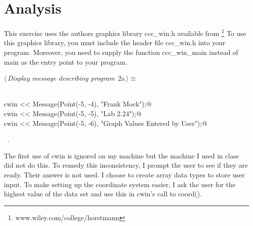 \documentclass{article}
\begin{document}
\section{Analysis}
This exercise uses the authors graphics library ccc\_win.h available
from \footnote{www.wiley.com/college/horstmann}
To use this graphics library, you must include the header file ccc\_win.h 
into your program. Moreover, you need to supply the function ccc\_win\_main 
instead of main as the entry point to your program.
\begin{flushleft} \small
\begin{minipage}{\linewidth}\label{scrap1}\raggedright\small
{} $\langle\,${\it Display message describing program}\nobreak\ {\footnotesize {2a}}$\,\rangle\equiv$
\vspace{-1ex}
\begin{list}{}{} \item
\mbox{}\verb@@\\
\mbox{}\verb@        cwin << Message(Point(-5, -4), "Frank Mock");@\\
\mbox{}\verb@        cwin << Message(Point(-5, -5), "Lab 2.24");@\\
\mbox{}\verb@        cwin << Message(Point(-5, -6), "Graph Values Entered by User");@\\
\mbox{}\verb@@{\NWsep}
\end{list}
\vspace{-1.5ex}
\footnotesize
\begin{list}{}{\setlength{\itemsep}{-\parsep}\setlength{\itemindent}{-\leftmargin}}
\item \NWtxtMacroRefIn\ .

\item{}
\end{list}
\end{minipage}\vspace{4ex}
\end{flushleft}
The first use of cwin is ignored on my machine but the machine I
used in class did not do this. To remedy this inconsistency, I prompt 
the user to see if they are ready. Their answer is not used. I choose
to create array data types to store user input. To make setting up
the coordinate system easier, I ask the user for the highest value
of the data set and use this in cwin's call to coord().
\end{document}
